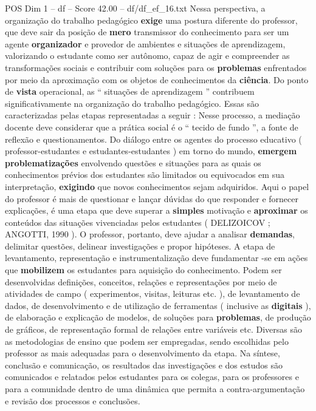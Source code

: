 \begin{textsample}{POS Dim 1 – df – Score 42.00 – df/df\_ef\_16.txt}
Nessa perspectiva, a organização do trabalho pedagógico \textbf{exige} uma postura diferente do professor, que deve sair da posição de \textbf{mero} transmissor do conhecimento para ser um agente \textbf{organizador} e provedor de ambientes e situações de aprendizagem, valorizando o estudante como ser autônomo, capaz de agir e compreender as transformações sociais e contribuir com soluções para os \textbf{problemas} enfrentados por meio da aproximação com os objetos de conhecimentos da \textbf{ciência}.
Do ponto de \textbf{vista} operacional, as “ situações de aprendizagem ” contribuem significativamente na organização do trabalho pedagógico.
Essas são caracterizadas pelas etapas representadas a seguir : Nesse processo, a mediação docente deve considerar que a prática social é o “ tecido de fundo ”, a fonte de reflexão e questionamentos.
Do diálogo entre os agentes do processo educativo ( professor-estudantes e estudantes-estudantes ) em torno do mundo, \textbf{emergem} \textbf{problematizações} envolvendo questões e situações para as quais os conhecimentos prévios dos estudantes são limitados ou equivocados em sua interpretação, \textbf{exigindo} que novos conhecimentos sejam adquiridos.
Aqui o papel do professor é mais de questionar e lançar dúvidas do que responder e fornecer explicações, é uma etapa que deve superar a \textbf{simples} motivação e \textbf{aproximar} os conteúdos das situações vivenciadas pelos estudantes ( DELIZOICOV ; ANGOTTI, 1990 ).
O professor, portanto, deve ajudar a analisar \textbf{demandas}, delimitar questões, delinear investigações e propor hipóteses.
A etapa de levantamento, representação e instrumentalização deve fundamentar -se em ações que \textbf{mobilizem} os estudantes para aquisição do conhecimento.
Podem ser desenvolvidas definições, conceitos, relações e representações por meio de atividades de campo ( experimentos, visitas, leituras etc. ), de levantamento de dados, de desenvolvimento e de utilização de ferramentas ( inclusive as \textbf{digitais} ), de elaboração e explicação de modelos, de soluções para \textbf{problemas}, de produção de gráficos, de representação formal de relações entre variáveis etc.
Diversas são as metodologias de ensino que podem ser empregadas, sendo escolhidas pelo professor as mais adequadas para o desenvolvimento da etapa.
Na síntese, conclusão e comunicação, os resultados das investigações e dos estudos são comunicados e relatados pelos estudantes para os colegas, para os professores e para a comunidade dentro de uma dinâmica que permita a contra-argumentação e revisão dos processos e conclusões.

\end{textsample}
